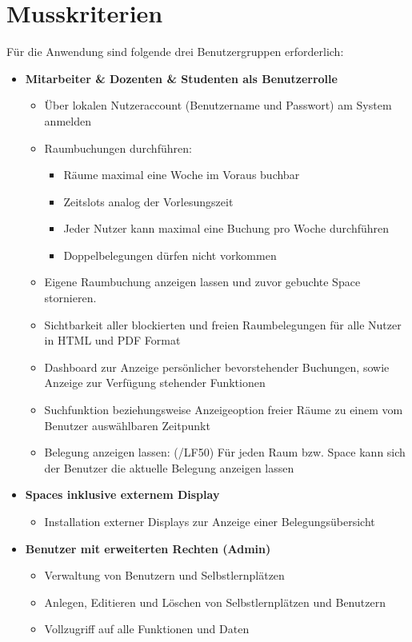 \documentclass[a4paper,report,headsepline]{scrreprt}
\begin{document}
\section{Musskriterien}\label{musskriterien}
Für die Anwendung sind folgende drei Benutzergruppen erforderlich:
\begin{itemize}
\item \textbf{Mitarbeiter \& Dozenten \& Studenten als Benutzerrolle}
\begin{itemize}
\item Über lokalen Nutzeraccount (Benutzername und Passwort) am System anmelden 
\item Raumbuchungen durchführen:
\begin{itemize}
\item Räume maximal eine Woche im Voraus buchbar 
\item Zeitslots analog der Vorlesungszeit
\item Jeder Nutzer kann maximal eine Buchung pro Woche durchführen
\item Doppelbelegungen dürfen nicht vorkommen
\end{itemize}
\item Eigene Raumbuchung anzeigen lassen und zuvor gebuchte Space stornieren.
\item Sichtbarkeit aller blockierten und freien Raumbelegungen für alle Nutzer in HTML und PDF Format
\item Dashboard zur Anzeige persönlicher bevorstehender Buchungen, sowie Anzeige zur Verfügung stehender Funktionen
\item Suchfunktion beziehungsweise Anzeigeoption freier Räume zu einem vom Benutzer auswählbaren Zeitpunkt
\item Belegung anzeigen lassen: (/LF50) Für jeden Raum bzw. Space kann sich der Benutzer die aktuelle Belegung anzeigen lassen
\end{itemize}


\item \textbf{Spaces inklusive externem Display}
\begin{itemize}
\item Installation externer Displays zur Anzeige einer Belegungsübersicht
\end{itemize}


\item \textbf{Benutzer mit erweiterten Rechten (Admin)}
\begin{itemize}
\item Verwaltung von Benutzern und Selbstlernplätzen
\item Anlegen, Editieren und Löschen von Selbstlernplätzen und Benutzern
\item Vollzugriff auf alle Funktionen und Daten
\end{itemize}
\end{itemize}
\end{document}
